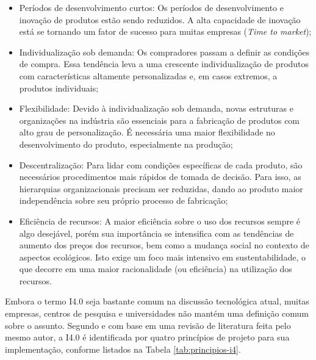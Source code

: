 	\begin{itemize}

		\item Períodos de desenvolvimento curtos: Os períodos de desenvolvimento e inovação de produtos estão sendo reduzidos. A alta capacidade de inovação está se tornando um fator de sucesso para muitas empresas (\textit{Time to market});
		
		\item Individualização sob demanda: Os compradores passam a definir as condições de compra. Essa tendência leva a uma crescente individualização de produtos com características altamente personalizadas e, em casos extremos, a produtos individuais;
		
		\item Flexibilidade: Devido à individualização sob demanda, novas estruturas e organizações na indústria são essenciais para a fabricação de produtos com alto grau de personalização. É necessária uma maior flexibilidade no desenvolvimento do produto, especialmente na produção;
		
		\item Descentralização: Para lidar com condições específicas de cada produto, são necessários procedimentos mais rápidos de tomada de decisão. Para isso, as hierarquias organizacionais precisam ser reduzidas, dando ao produto maior independência sobre seu próprio processo de fabricação;
		
		\item Eficiência de recursos: A maior eficiência sobre o uso dos recursos sempre é algo desejável, porém sua importância se intensifica com as tendências de aumento dos preços dos recursos, bem como a mudança social no contexto de aspectos ecológicos. Isto exige um foco mais intensivo em sustentabilidade, o que decorre em uma maior racionalidade (ou eficiência) na utilização dos recursos.

	\end{itemize}

	Embora o termo I4.0 seja bastante comum na discussão tecnológica atual, muitas empresas, centros de pesquisa e universidades não mantém uma definição comum sobre o assunto. Segundo  e com base em uma revisão de literatura feita pelo mesmo autor, a I4.0 é identificada por quatro princípios de projeto para sua implementação, conforme listados na Tabela \ref{tab:principios-i4}.


